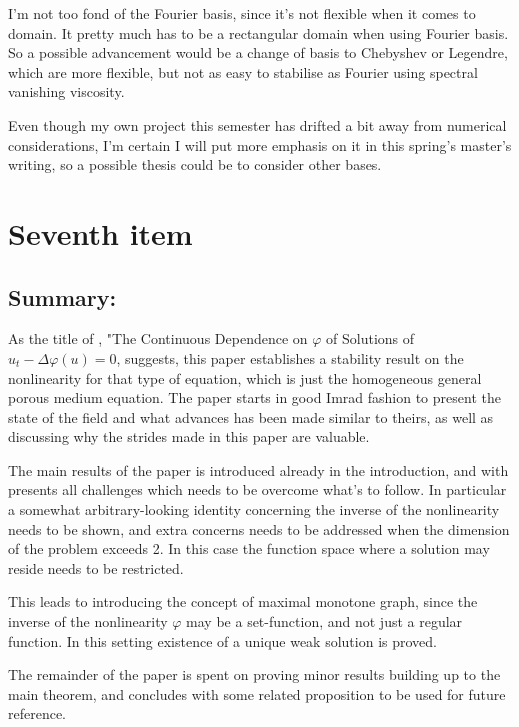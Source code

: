 \documentclass[11pt, a4paper]{article}
\begin{document}
I'm not too fond of the Fourier basis, since it's not flexible when it comes to domain. It pretty much has to be a rectangular domain when using Fourier basis. So a possible advancement would be a change of basis to Chebyshev or Legendre, which are more flexible, but not as easy to stabilise as Fourier using spectral vanishing viscosity.

Even though my own project this semester has drifted a bit away from numerical considerations, I'm certain I will put more emphasis on it in this spring's master's writing, so a possible thesis could be to consider other bases.


\newpage
\section{Seventh item}
\subsection{Summary:}
As the title of \cite{benilan1981continuous}, "The Continuous Dependence on $\varphi$ of Solutions of $u_t - \Delta\varphi(u) = 0$, suggests, this paper establishes a stability result on the nonlinearity for that type of equation, which is just the homogeneous general porous medium equation. The paper starts in good Imrad fashion to present the state of the field and what advances has been made similar to theirs, as well as discussing why the strides made in this paper are valuable.

The main results of the paper is introduced already in the introduction, and with presents all challenges which needs to be overcome what's to follow. In particular a somewhat arbitrary-looking identity  concerning the inverse of the nonlinearity needs to be shown, and extra concerns needs to be addressed when the dimension of the problem exceeds 2. In this case the function space where a solution may reside needs to be restricted.

This leads to introducing the concept of maximal monotone graph, since the inverse of the nonlinearity $\varphi$ may be a set-function, and not just a regular function. In this setting existence of a unique weak solution is proved. 

The remainder of the paper is spent on proving minor results building up to the main theorem, and concludes with some related proposition to be used for future reference.
\end{document}
